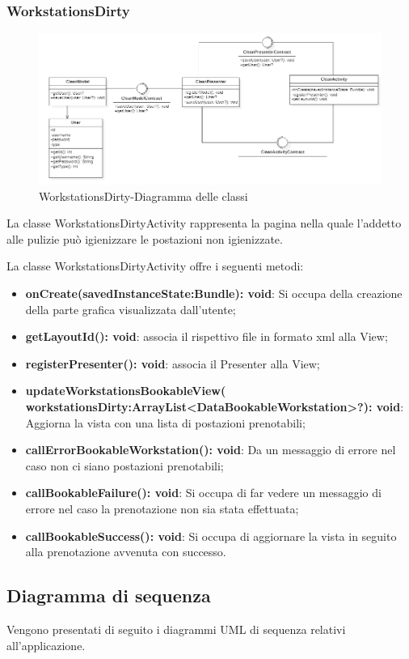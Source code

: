 \subsubsection{WorkstationsDirty}
\begin{figure}[H]
	\centering
	\includegraphics[width=16cm]{res/images/Clean.png}
	\caption{WorkstationsDirty-Diagramma delle classi}
	\label{fig:WorkstationsDirty-Diagramma delle classi}
\end{figure}
La classe WorkstationsDirtyActivity rappresenta la pagina nella quale l'addetto alle pulizie può igienizzare le postazioni non igienizzate.

La classe WorkstationsDirtyActivity offre i seguenti metodi:
\begin{itemize}
	\item \textbf{onCreate(savedInstanceState:Bundle): void}: Si occupa della creazione della parte grafica visualizzata dall'utente; 
	\item \textbf{getLayoutId(): void}: associa il rispettivo file in formato xml alla View;
	\item \textbf{registerPresenter(): void}: associa il Presenter alla View; 
	\item \textbf{updateWorkstationsBookableView( workstationsDirty:ArrayList<DataBookableWorkstation>?): void}: Aggiorna la vista con una lista di postazioni prenotabili; 
	\item \textbf{callErrorBookableWorkstation(): void}: Da un messaggio di errore nel caso non ci siano postazioni prenotabili;
	\item \textbf{callBookableFailure(): void}: Si occupa di far vedere un messaggio di errore nel caso la prenotazione non sia stata effettuata; 
	\item \textbf{callBookableSuccess(): void}: Si occupa di aggiornare la vista in seguito alla prenotazione avvenuta con successo.
\end{itemize}

\subsection{Diagramma di sequenza}
Vengono presentati di seguito i diagrammi UML di sequenza relativi all'applicazione.

